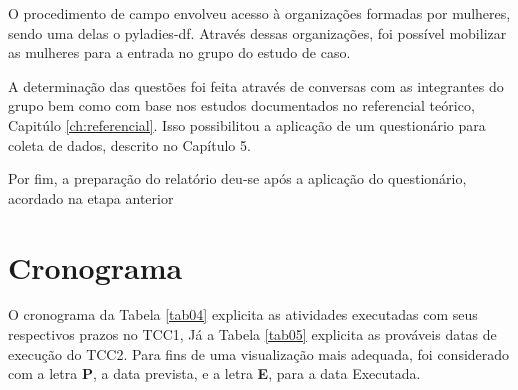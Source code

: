 O procedimento de campo envolveu acesso à organizações formadas por mulheres, sendo uma delas o pyladies-df. Através dessas organizações, foi possível mobilizar as mulheres 
para a entrada no grupo do estudo de caso.

A determinação das questões foi feita através de conversas com as 
integrantes do grupo bem como com base nos estudos documentados no 
referencial teórico, Capitúlo \ref{ch:referencial}. Isso possibilitou a aplicação de 
um questionário para coleta de dados, descrito no Capítulo 5.

Por fim, a preparação do relatório deu-se após a aplicação do questionário, acordado na etapa anterior
\section{Cronograma}

O cronograma da Tabela \ref{tab04} explicita as atividades executadas com seus respectivos prazos no TCC1, Já a Tabela \ref{tab05} 
explicita as prováveis datas de execução do TCC2.
Para fins de uma visualização mais adequada, foi considerado com a letra \textbf{P}, a
data prevista, e a letra \textbf{E}, para a data Executada.

